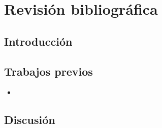  
\chapter{Revisión bibliográfica}
\section{Introducción}

\section{Trabajos previos}

\begin{itemize}
\item {} \cite{Brown1992}
\end{itemize}

\section{Discusión}
